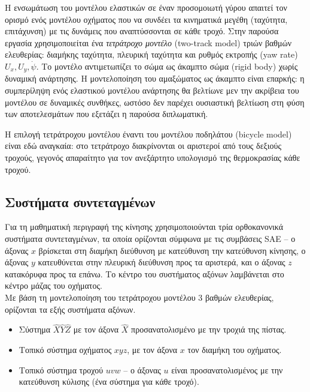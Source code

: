 Η ενσωμάτωση του μοντέλου ελαστικών σε έναν προσομοιωτή γύρου απαιτεί τον ορισμό 
ενός μοντέλου οχήματος που να συνδέει τα κινηματικά μεγέθη (ταχύτητα, επιτάχυνση)
με τις δυνάμεις που αναπτύσσονται σε κάθε τροχό. Στην παρούσα εργασία χρησιμοποιείται
ένα \emph{τετράτροχο μοντέλο} (two-track model) τριών βαθμών ελευθερίας: διαμήκης
ταχύτητα, πλευρική ταχύτητα και ρυθμός εκτροπής (yaw rate) $U_x,U_y,\dot{\psi} $. Το μοντέλο αντιμετωπίζει το 
σώμα ως άκαμπτο σώμα (rigid body) χωρίς δυναμική ανάρτησης. Η μοντελοποίηση του αμαξώματος
ως άκαμπτο είναι επαρκής: η συμπερίληψη ενός ελαστικού
μοντέλου ανάρτησης θα βελτίωνε μεν την ακρίβεια του μοντέλου σε δυναμικές συνθήκες,
ωστόσο δεν παρέχει ουσιαστική βελτίωση στη φύση των αποτελεσμάτων που εξετάζει η παρούσα διπλωματική.

Η επιλογή τετράτροχου μοντέλου έναντι του μοντέλου ποδηλάτου (bicycle model) είναι εδώ αναγκαία: στο τετράτροχο διακρίνονται
οι αριστεροί από τους δεξιούς τροχούς, γεγονός απαραίτητο για τον ανεξάρτητο υπολογισμό της θερμοκρασίας
κάθε τροχού.


\subsection{Συστήματα συντεταγμένων}
\label{subsec:frames}

Για τη μαθηματική περιγραφή της κίνησης χρησιμοποιούνται τρία ορθοκανονικά συστήματα συντεταγμένων,
τα οποία ορίζονται σύμφωνα με τις συμβάσεις SAE \cite{Milliken1995} -- ο άξονας $x$ βρίσκεται στη διαμήκη
διεύθυνση με κατεύθυνση την κατεύθυνση κίνησης, ο άξονας $y$ κατευθύνεται στην πλευρική διεύθυνση προς τα
αριστερά, και ο άξονας $z$ κατακόρυφα προς τα επάνω. Το κέντρο του συστήματος αξόνων λαμβάνεται στο κέντρο
μάζας του οχήματος.\\[6pt]
\noindent Με βάση τη μοντελοποίηση του τετράτροχου μοντέλου 3 βαθμών ελευθερίας, ορίζονται τα εξής συστήματα αξόνων.
\begin{itemize}
  \item Σύστημα $\hat{X}\hat{Y}\hat{Z}$ με τον άξονα $\hat{X}$ προσανατολισμένο με την τροχιά της πίστας.
  \item Τοπικό σύστημα οχήματος $xyz$, με τον άξονα $x$ τον διαμήκη του οχήματος.
  \item Τοπικό σύστημα τροχού $uvw$ -- ο άξονας $u$ είναι προσανατολισμένος με την κατεύθυνση κύλισης (ένα σύστημα για κάθε τροχό).
\end{itemize}

